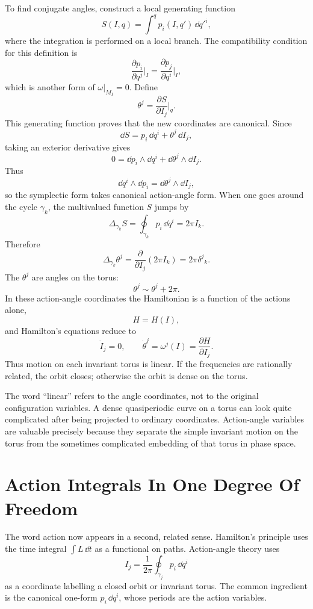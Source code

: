 To find conjugate angles, construct a local generating function
\[
  S(I,q)
  =
  \int^q p_i(I,q')\,\dd q'^i,
\]
where the integration is performed on a local branch. The compatibility
condition for this definition is
\[
  \frac{\partial p_i}{\partial q^j}\bigg|_I
  =
  \frac{\partial p_j}{\partial q^i}\bigg|_I,
\]
which is another form of \(\omega|_{M_I}=0\). Define
\[
  \theta^j=\frac{\partial S}{\partial I_j}\bigg|_q.
\]
This generating function proves that the new coordinates are canonical. Since
\[
  \dd S=p_i\,\dd q^i+\theta^j\,\dd I_j,
\]
taking an exterior derivative gives
\[
  0=\dd p_i\wedge\dd q^i+\dd\theta^j\wedge\dd I_j.
\]
Thus
\[
  \dd q^i\wedge\dd p_i=\dd\theta^j\wedge\dd I_j,
\]
so the symplectic form takes canonical action-angle form.
When one goes around the cycle \(\gamma_k\), the multivalued function \(S\)
jumps by
\[
  \Delta_{\gamma_k}S=\oint_{\gamma_k}p_i\,\dd q^i=2\pi I_k.
\]
Therefore
\[
  \Delta_{\gamma_k}\theta^j
  =
  \frac{\partial}{\partial I_j}(2\pi I_k)
  =
  2\pi\delta^j{}_k.
\]
The \(\theta^j\) are angles on the torus:
\[
  \theta^j\sim \theta^j+2\pi.
\]
In these action-angle coordinates the Hamiltonian is a function of the actions
alone,
\[
  H=H(I),
\]
and Hamilton's equations reduce to
\[
  \dot I_j=0,\qquad
  \dot\theta^j=\omega^j(I)=\frac{\partial H}{\partial I_j}.
\]
Thus motion on each invariant torus is linear. If the frequencies are rationally
related, the orbit closes; otherwise the orbit is dense on the torus.

The word ``linear'' refers to the angle coordinates, not to the original
configuration variables. A dense quasiperiodic curve on a torus can look quite
complicated after being projected to ordinary coordinates. Action-angle
variables are valuable precisely because they separate the simple invariant
motion on the torus from the sometimes complicated embedding of that torus in
phase space.

\section{Action Integrals In One Degree Of Freedom}
\label{sec:one-dimensional-action-integrals}

The word action now appears in a second, related sense. Hamilton's principle
uses the time integral \(\int L\,\dd t\) as a functional on paths. Action-angle
theory uses
\[
  I_j=\frac{1}{2\pi}\oint_{\gamma_j}p_i\,\dd q^i
\]
as a coordinate labelling a closed orbit or invariant torus. The
common ingredient is the canonical one-form \(p_i\,\dd q^i\), whose periods are
the action variables.

